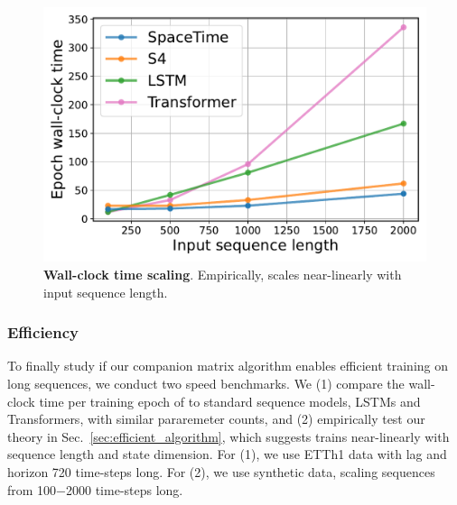 \begin{figure}[H]
\begin{minipage}[c]{0.45\textwidth}
\centering
{}\label{tab:wallclock_etth}
\end{minipage}
\quad
\begin{minipage}[c]{0.45\textwidth}
\centering
 \includegraphics[width=1\textwidth]{_ICLR2023_paper/figures/speed_benchmark_square.pdf}
  \caption{ \textbf{Wall-clock time scaling}. Empirically, \ourmethod{} scales near-linearly with input sequence length.}
  \label{fig:wallclock_synth} 
\end{minipage}
\end{figure}


\subsubsection{Efficiency}
 \label{sec:empirical_efficiency}
To finally study if our companion matrix algorithm enables efficient training on long sequences, 
we conduct two speed benchmarks. We (1) compare the wall-clock time per training epoch of \ourmethod{} to standard sequence models, \eg{} LSTMs and Transformers, with similar pararemeter counts, and (2) empirically test our theory in Sec.~\ref{sec:efficient_algorithm}, which suggests \ourmethod{} trains near-linearly with sequence length and state dimension. For (1), we use ETTh1 data with lag and horizon 720 time-steps long. For (2), we use synthetic data, scaling sequences from 100$-$2000 time-steps long. 


